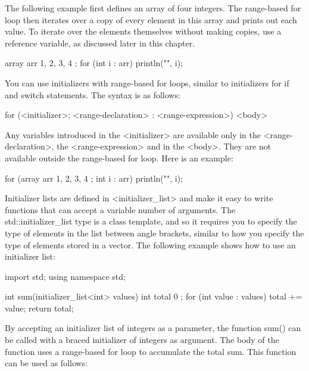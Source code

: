 The following example first defines an array of four integers. The range-based for loop then iterates over a copy of every element in this array and prints out each value. To iterate over the elements themselves without making copies, use a reference variable, as discussed later in this chapter.

\begin{cpp}
array arr { 1, 2, 3, 4 };
for (int i : arr) { println("{}", i); }
\end{cpp}


You can use initializers with range-based for loops, similar to initializers for if and switch statements. The syntax is as follows:

\begin{cpp}
for (<initializer>; <range-declaration> : <range-expression>) { <body> }
\end{cpp}

Any variables introduced in the <initializer> are available only in the <range-declaration>, the <range-expression> and in the <body>. They are not available outside the range-based for loop.
Here is an example:

\begin{cpp}
for (array arr { 1, 2, 3, 4 }; int i : arr) { println("{}", i); }
\end{cpp}


Initializer lists are defined in <initializer\_list> and make it easy to write functions that can accept a variable number of arguments. The std::initializer\_list type is a class template, and so it requires you to specify the type of elements in the list between angle brackets, similar to how you specify the type of elements stored in a vector. The following example shows how to use an initializer list:

\begin{cpp}
import std;
using namespace std;

int sum(initializer_list<int> values)
{
    int total { 0 };
    for (int value : values) {
        total += value;
    }
    return total;
}
\end{cpp}

By accepting an initializer list of integers as a parameter, the function sum() can be called with a braced initializer of integers as argument. The body of the function uses a range-based for loop to accumulate the total sum. This function can be used as follows:

